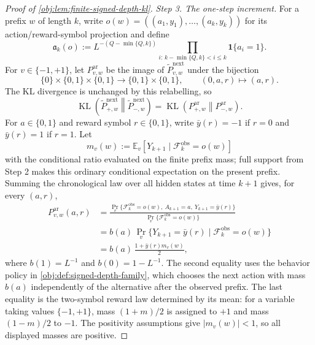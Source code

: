 \begin{proof}[Proof of \cref{obj:lem:finite-signed-depth-kl}]
\emph{Step 3. The one-step increment.}
For a prefix \(w\) of length \(k\), write \(o(w)=((a_1,y_1),\ldots,(a_k,y_k))\) for its action/reward-symbol projection and define
\[
\mathfrak a_k(o)
:=
L^{-(Q-\min\{Q,k\})}
\prod_{i:\,k-\min\{Q,k\}<i\le k}\mathbf 1\{a_i=1\}.
\]
For \(v\in\{-1,+1\}\), let \(P_{v,w}^{\mathrm{ar}}\) be the image of \(\widetilde P_{v,w}^{\mathrm{next}}\) under the bijection
\[
\{0\}\times\{0,1\}\times\{0,1\}\longrightarrow \{0,1\}\times\{0,1\},
\qquad
(0,a,r)\longmapsto(a,r).
\]
The KL divergence is unchanged by this relabelling, so
\[
\operatorname{KL}\!\left(\widetilde P_{+,w}^{\mathrm{next}}\middle\|\widetilde P_{-,w}^{\mathrm{next}}\right)
=
\operatorname{KL}\!\left(P_{+,w}^{\mathrm{ar}}\middle\|P_{-,w}^{\mathrm{ar}}\right).
\]
For \(a\in\{0,1\}\) and reward symbol \(r\in\{0,1\}\), write \(\bar y(r)=-1\) if \(r=0\) and \(\bar y(r)=1\) if \(r=1\).  Let
\[
m_v(w):=
\mathbb E_v[Y_{k+1}\mid\mathcal F_k^{\mathrm{obs}}=o(w)]
\]
with the conditional ratio evaluated on the finite prefix mass; full support from Step 2 makes this ordinary conditional expectation on the present prefix.  Summing the chronological law over all hidden states at time \(k+1\) gives, for every \((a,r)\),
\[
\begin{aligned}
P_{v,w}^{\mathrm{ar}}(a,r)
&=
\frac{
\Pr_v\{\mathcal F_k^{\mathrm{obs}}=o(w),\ A_{k+1}=a,\ Y_{k+1}=\bar y(r)\}}
{\Pr_v\{\mathcal F_k^{\mathrm{obs}}=o(w)\}}  \\
&=
 b(a)\,\Pr_v\{Y_{k+1}=\bar y(r)\mid\mathcal F_k^{\mathrm{obs}}=o(w)\} \\
&=
 b(a)\,\frac{1+\bar y(r)m_v(w)}{2},
\end{aligned}
\]
where \(b(1)=L^{-1}\) and \(b(0)=1-L^{-1}\).  The second equality uses the behavior policy in \cref{obj:def:signed-depth-family}, which chooses the next action with mass \(b(a)\) independently of the alternative after the observed prefix.  The last equality is the two-symbol reward law determined by its mean: for a variable taking values \(\{-1,+1\}\), mass \((1+m)/2\) is assigned to \(+1\) and mass \((1-m)/2\) to \(-1\).  The positivity assumptions give \(|m_v(w)|<1\), so all displayed masses are positive.


\end{proof}
